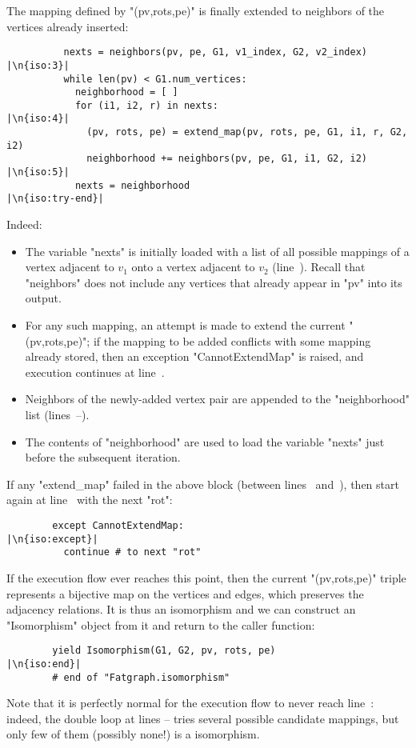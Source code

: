 The mapping defined by "(pv,rots,pe)" is finally extended to neighbors
of the vertices already inserted:
\begin{lstlisting}
          nexts = neighbors(pv, pe, G1, v1_index, G2, v2_index)  |\n{iso:3}|
          while len(pv) < G1.num_vertices:
            neighborhood = [ ]
            for (i1, i2, r) in nexts:                            |\n{iso:4}|
              (pv, rots, pe) = extend_map(pv, rots, pe, G1, i1, r, G2, i2)
              neighborhood += neighbors(pv, pe, G1, i1, G2, i2)  |\n{iso:5}|
            nexts = neighborhood                           |\n{iso:try-end}|

\end{lstlisting}
Indeed:
\begin{itemize}
\item The variable "nexts" is initially loaded with a list of all
  possible mappings of a vertex adjacent to $v_1$ onto a vertex
  adjacent to $v_2$ (line~).  Recall that "neighbors" does
  not include any vertices that already appear in "pv" into its
  output.
\item For any such mapping, an attempt is made to extend the current
  "(pv,rots,pe)"; if the mapping to be added conflicts with some
  mapping already stored, then an exception "CannotExtendMap" is
  raised, and execution continues at line~.
\item Neighbors of the newly-added vertex pair are appended to the
  "neighborhood" list (lines~--).
\item The contents of "neighborhood" are used to load the variable
  "nexts" just before the subsequent iteration.
\end{itemize}
If any "extend_map" failed in the above block (between
lines~ and~), then start again at
line~ with the next "rot":
\begin{lstlisting}
        except CannotExtendMap:                             |\n{iso:except}|
          continue # to next "rot"

\end{lstlisting}

If the execution flow ever reaches this point, then the current
"(pv,rots,pe)" triple represents a bijective map on the vertices and
edges, which preserves the adjacency relations.  It is thus an
isomorphism and we can construct an "Isomorphism" object from
it and return to the caller function:
\begin{lstlisting}
        yield Isomorphism(G1, G2, pv, rots, pe)                |\n{iso:end}|
        # end of "Fatgraph.isomorphism"

\end{lstlisting}
Note that it is perfectly normal for the execution flow to never reach
line~: indeed, the double loop at lines
-- tries several possible candidate
mappings, but only few of them (possibly none!) is a isomorphism.

